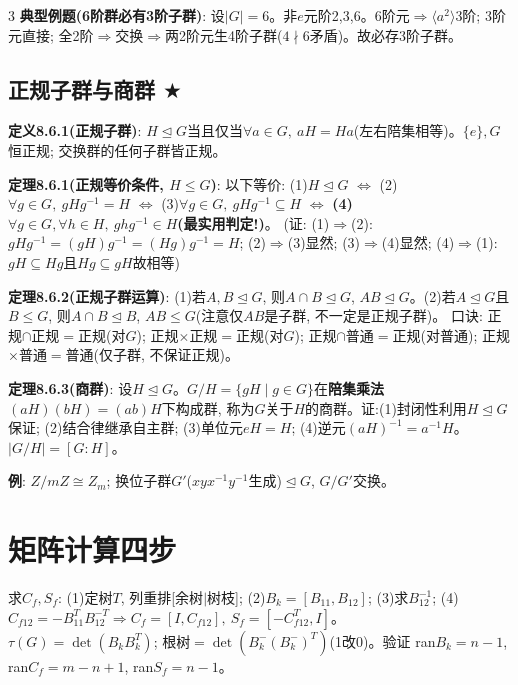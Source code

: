 \documentclass[4.5pt,landscape]{extarticle}
\newcommand{\rd}[1]{\textcolor{rd}{\textbf{#1}}}
\newcommand{\bu}[1]{\textcolor{bu}{\textbf{#1}}}
\newcommand{\xt}[1]{\textbf{#1}}
\begin{document}
\begin{multicols*}{3}
\xt{典型例题(6阶群必有3阶子群)}: 设$|G|=6$。非$e$元阶2,3,6。6阶元$\Rightarrow\langle a^2\rangle$3阶; 3阶元直接; 全2阶$\Rightarrow$交换$\Rightarrow$两2阶元生4阶子群($4\nmid6$矛盾)。故必存3阶子群。

\subsection{正规子群与商群 $\bigstar$}
\rd{定义8.6.1(正规子群)}: $H\trianglelefteq G$当且仅当$\forall a\in G,\ aH=Ha$(左右陪集相等)。$\{e\},G$恒正规; 交换群的任何子群皆正规。

\rd{定理8.6.1(正规等价条件, $H\leq G$)}: 以下等价:
(1)$H\trianglelefteq G$ $\Leftrightarrow$ (2)$\forall g\in G,\ gHg^{-1}=H$ $\Leftrightarrow$ (3)$\forall g\in G,\ gHg^{-1}\subseteq H$ $\Leftrightarrow$ \bu{(4)$\forall g\in G,\forall h\in H,\ ghg^{-1}\in H$(最实用判定!)}。
(证: (1)$\Rightarrow$(2): $gHg^{-1}=(gH)g^{-1}=(Hg)g^{-1}=H$; (2)$\Rightarrow$(3)显然; (3)$\Rightarrow$(4)显然; (4)$\Rightarrow$(1): $gH\subseteq Hg$且$Hg\subseteq gH$故相等)

\rd{定理8.6.2(正规子群运算)}: (1)若$A,B\trianglelefteq G$, 则$A\cap B\trianglelefteq G$, $AB\trianglelefteq G$。(2)若$A\trianglelefteq G$且$B\leq G$, 则$A\cap B\trianglelefteq B$, $AB\leq G$(注意仅$AB$是子群, 不一定是正规子群)。
口诀: 正规$\cap$正规$=$正规(对$G$); 正规$\times$正规$=$正规(对$G$); 正规$\cap$普通$=$正规(对普通); 正规$\times$普通$=$普通(仅子群, 不保证正规)。

\rd{定理8.6.3(商群)}: 设$H\trianglelefteq G$。$G/H=\{gH\mid g\in G\}$在\xt{陪集乘法}$(aH)(bH)=(ab)H$下构成群, 称为$G$关于$H$的商群。证:(1)封闭性利用$H\trianglelefteq G$保证; (2)结合律继承自主群; (3)单位元$eH=H$; (4)逆元$(aH)^{-1}=a^{-1}H$。$|G/H|=[G:H]$。

\xt{例}: $Z/mZ\cong Z_m$; 换位子群$G'$($xyx^{-1}y^{-1}$生成)$\trianglelefteq G$, $G/G'$交换。

\section*{矩阵计算四步}
求$C_f,S_f$: (1)定树$T$, 列重排[余树$|$树枝]; (2)$B_k=[B_{11},B_{12}]$; (3)求$B_{12}^{-1}$; (4)$C_{f12}=-B_{11}^TB_{12}^{-T}\Rightarrow C_f=[I,C_{f12}],\ S_f=[-C_{f12}^T,I]$。\\
$\tau(G)=\det(B_kB_k^T)$; 根树$=\det(B_k^-(B_k^-)^T)$(1改0)。验证 ran$B_k=n-1$, ran$C_f=m-n+1$, ran$S_f=n-1$。

\end{multicols*}
\end{document}

